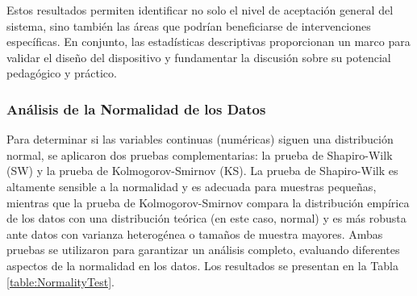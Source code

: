 \documentclass[a4paper,fleqn]{cas-sc}
\begin{document}
				Estos resultados permiten identificar no solo el nivel de aceptación general del sistema, sino también las áreas que podrían beneficiarse de intervenciones específicas. En conjunto, las estadísticas descriptivas proporcionan un marco para validar el diseño del dispositivo y fundamentar la discusión sobre su potencial pedagógico y práctico.
				
			\subsubsection{Análisis de la Normalidad de los Datos}
				Para determinar si las variables continuas (numéricas) siguen una distribución normal, se aplicaron dos pruebas complementarias: la prueba de Shapiro-Wilk (SW) y la prueba de Kolmogorov-Smirnov (KS). La prueba de Shapiro-Wilk es altamente sensible a la normalidad y es adecuada para muestras pequeñas, mientras que la prueba de Kolmogorov-Smirnov compara la distribución empírica de los datos con una distribución teórica (en este caso, normal) y es más robusta ante datos con varianza heterogénea o tamaños de muestra mayores. Ambas pruebas se utilizaron para garantizar un análisis completo, evaluando diferentes aspectos de la normalidad en los datos. Los resultados se presentan en la Tabla \ref{table:NormalityTest}.
				
\end{document}
